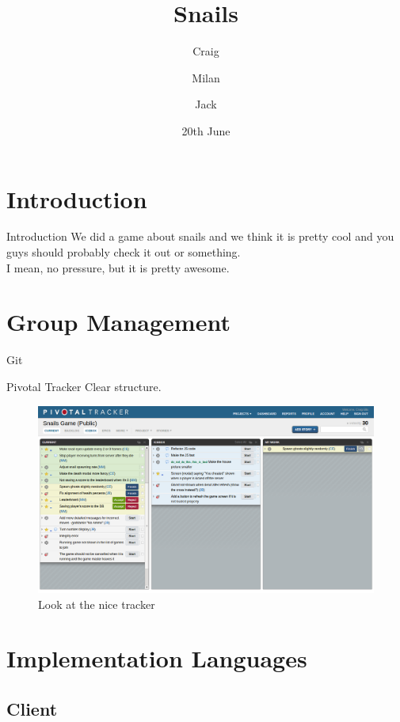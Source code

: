 \documentclass{beamer}
\title{Snails}
\author{Craig \and Milan \and Jack}
\date{20th June}
\begin{document}
\begin{frame}
  \titlepage
\end{frame}

\section{Introduction}

\begin{frame}{Introduction}
  We did a game about snails and we think it is pretty cool and you guys should probably check it out or something. \\
  \vspace{\baselineskip}
  I mean, no pressure, but it is pretty awesome.
\end{frame}


\section{Group Management}

\begin{frame}{Git}
\end{frame}

\begin{frame}{Pivotal Tracker}
  Clear structure.
  \begin{figure}[htb]
    \centering
    \includegraphics[scale=0.25]{pivotal.png}
    \caption{Look at the nice tracker}
  \end{figure}
\end{frame}

\section{Implementation Languages}
\subsection{Client}
\end{document}
